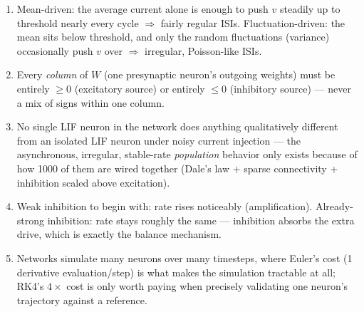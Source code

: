 \documentclass[11pt,a4paper]{article}
\begin{document}
{\begin{enumerate}[itemsep=2pt, leftmargin=1.6em]
  \item Mean-driven: the average current alone is enough to push $v$ steadily up to threshold nearly every cycle $\Rightarrow$ fairly regular ISIs. Fluctuation-driven: the mean sits below threshold, and only the random fluctuations (variance) occasionally push $v$ over $\Rightarrow$ irregular, Poisson-like ISIs.
  \item Every \emph{column} of $W$ (one presynaptic neuron's outgoing weights) must be entirely $\ge 0$ (excitatory source) or entirely $\le 0$ (inhibitory source) — never a mix of signs within one column.
  \item No single LIF neuron in the network does anything qualitatively different from an isolated LIF neuron under noisy current injection — the asynchronous, irregular, stable-rate \emph{population} behavior only exists because of how 1000 of them are wired together (Dale's law + sparse connectivity + inhibition scaled above excitation).
  \item Weak inhibition to begin with: rate rises noticeably (amplification). Already-strong inhibition: rate stays roughly the same — inhibition absorbs the extra drive, which is exactly the balance mechanism.
  \item Networks simulate many neurons over many timesteps, where Euler's cost (1 derivative evaluation/step) is what makes the simulation tractable at all; RK4's $4\times$ cost is only worth paying when precisely validating one neuron's trajectory against a reference.
\end{enumerate}
}
	\newpage
\end{document}
